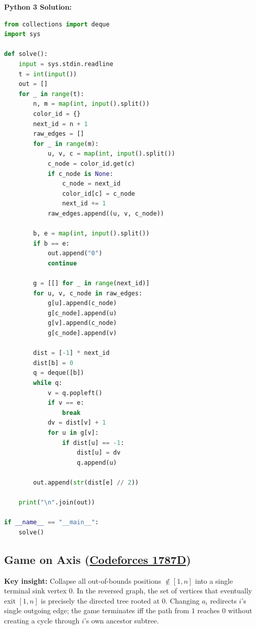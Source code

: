 \documentclass[11pt]{article}
\newcommand{\insight}[1]{\par\medskip\noindent\textbf{Key insight:} #1\par\smallskip}
\begin{document}
\textbf{Python 3 Solution:}
\begin{lstlisting}[language=Python]
from collections import deque
import sys

def solve():
    input = sys.stdin.readline
    t = int(input())
    out = []
    for _ in range(t):
        n, m = map(int, input().split())
        color_id = {}
        next_id = n + 1
        raw_edges = []
        for _ in range(m):
            u, v, c = map(int, input().split())
            c_node = color_id.get(c)
            if c_node is None:
                c_node = next_id
                color_id[c] = c_node
                next_id += 1
            raw_edges.append((u, v, c_node))

        b, e = map(int, input().split())
        if b == e:
            out.append("0")
            continue

        g = [[] for _ in range(next_id)]
        for u, v, c_node in raw_edges:
            g[u].append(c_node)
            g[c_node].append(u)
            g[v].append(c_node)
            g[c_node].append(v)

        dist = [-1] * next_id
        dist[b] = 0
        q = deque([b])
        while q:
            v = q.popleft()
            if v == e:
                break
            dv = dist[v] + 1
            for u in g[v]:
                if dist[u] == -1:
                    dist[u] = dv
                    q.append(u)

        out.append(str(dist[e] // 2))

    print("\n".join(out))

if __name__ == "__main__":
    solve()
\end{lstlisting}

\subsection{Game on Axis (\href{https://codeforces.com/problemset/problem/1787/D}{Codeforces 1787D})}

\insight{Collapse all out-of-bounds positions $\notin [1, n]$ into a single terminal sink vertex $0$. In the reversed graph, the set of vertices that eventually exit $[1, n]$ is precisely the directed tree rooted at $0$. Changing $a_i$ redirects $i$'s single outgoing edge; the game terminates iff the path from $1$ reaches $0$ without creating a cycle through $i$'s own ancestor subtree.}
\end{document}
